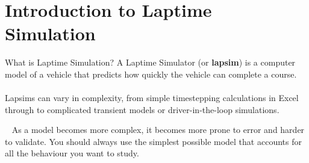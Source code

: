 \section*{Introduction to Laptime Simulation}

\begin{frame}{What is Laptime Simulation?}
    A Laptime Simulator (or \textbf{lapsim}) is a computer model of a vehicle that predicts how quickly the vehicle can complete a course.
    \\~\\
    Lapsims can vary in complexity, from simple timestepping calculations in Excel through to complicated transient models or driver-in-the-loop simulations.
    \begin{block}{~}
        As a model becomes more complex, it becomes more prone to error and harder to validate. You should always use the simplest possible model that accounts for all the behaviour you want to study.
    \end{block}
\end{frame}